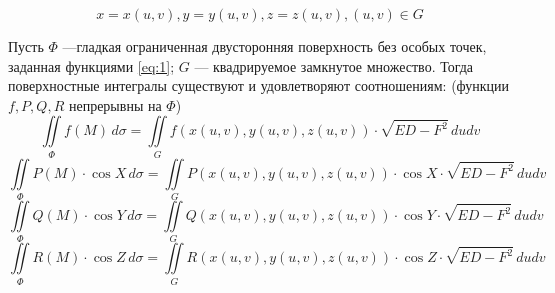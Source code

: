 \documentclass[a4paper,10pt]{article}
\begin{document}
	
	\jeolmnewheader
	
	\begin{equation}\label{eq:1}
	x = x(u, v), y=y(u, v), z = z(u, v), (u, v) \in G
	\end{equation}
	
	\begin{thm}
		Пусть $\Phi$ ---гладкая ограниченная двусторонняя поверхность без особых точек, заданная функциями \eqref{eq:1}; $G$ --- квадрируемое замкнутое множество. Тогда поверхностные интегралы существуют и удовлетворяют соотношениям: (функции $f, P, Q, R$ непрерывны на $\Phi$)
		\begin{equation}\label{eq:2}
			\iint\limits_\Phi f(M) \, d\sigma = \iint\limits_G f(x(u, v), y(u, v), z(u, v)) \cdot \sqrt{ED - F^2} \, dudv
		\end{equation}
		\begin{equation}\label{eq:3}
		\iint\limits_\Phi P(M) \cdot \cos X \, d\sigma = \iint\limits_G P(x(u, v), y(u, v), z(u, v)) \cdot \cos X \cdot \sqrt{ED - F^2} \, dudv
		\end{equation}
		\begin{equation}\label{eq:4}
		\iint\limits_\Phi Q(M) \cdot \cos Y \, d\sigma = \iint\limits_G Q(x(u, v), y(u, v), z(u, v)) \cdot \cos Y \cdot \sqrt{ED - F^2} \, dudv
		\end{equation}
		\begin{equation}\label{eq:5}
		\iint\limits_\Phi R(M) \cdot \cos Z \, d\sigma = \iint\limits_G R(x(u, v), y(u, v), z(u, v)) \cdot \cos Z \cdot \sqrt{ED - F^2} \, dudv
		\end{equation}
	\end{thm}
	
\end{document}
